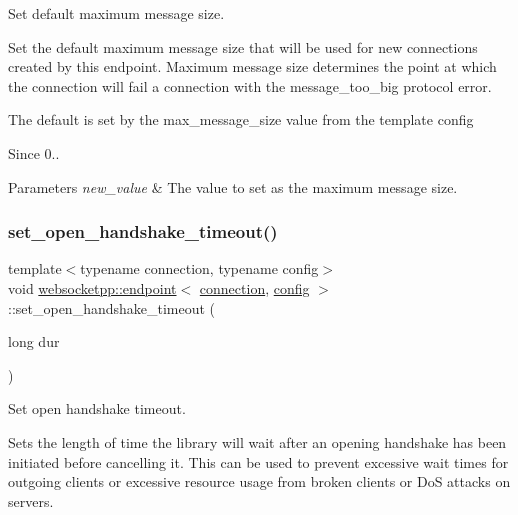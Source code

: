 Set default maximum message size. 

Set the default maximum message size that will be used for new connections created by this endpoint. Maximum message size determines the point at which the connection will fail a connection with the message\+\_\+too\+\_\+big protocol error.

The default is set by the max\+\_\+message\+\_\+size value from the template config

\begin{DoxySince}{Since}
0..
\end{DoxySince}

\begin{DoxyParams}{Parameters}
{\em new\+\_\+value} & The value to set as the maximum message size. \\
\hline
\end{DoxyParams}
\mbox{\label{classwebsocketpp_1_1endpoint_adb8b3736e30bb8e5ee6add965a948102}} 
\subsubsection{\texorpdfstring{set\+\_\+open\+\_\+handshake\+\_\+timeout()}{set\_open\_handshake\_timeout()}}
{\footnotesize\ttfamily template$<$typename connection, typename config$>$ \\
void \mbox{\hyperlink{classwebsocketpp_1_1endpoint}{websocketpp\+::endpoint}}$<$ \mbox{\hyperlink{classwebsocketpp_1_1connection}{connection}}, \mbox{\hyperlink{classconfig}{config}} $>$\+::set\+\_\+open\+\_\+handshake\+\_\+timeout (\begin{DoxyParamCaption}\item[{long}]{dur }\end{DoxyParamCaption})\hspace{0.3cm}{\ttfamily [inline]}}



Set open handshake timeout. 

Sets the length of time the library will wait after an opening handshake has been initiated before cancelling it. This can be used to prevent excessive wait times for outgoing clients or excessive resource usage from broken clients or DoS attacks on servers.

